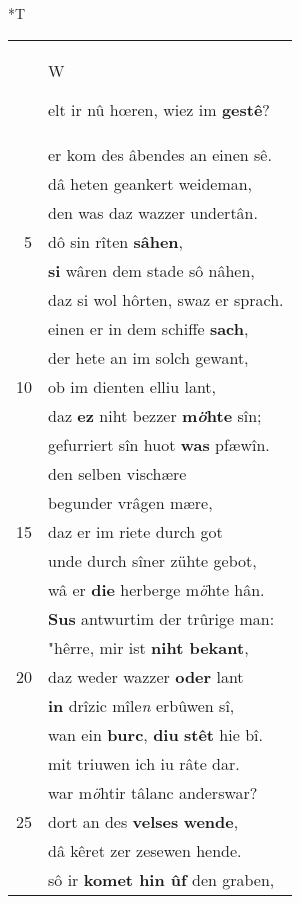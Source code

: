 \documentclass[8pt,a4paper,notitlepage]{article}
\begin{document}
\begin{table}[ht]
\begin{minipage}[t]{0.5\linewidth}
\end{minipage}
\hspace{0.5cm}
\begin{minipage}[t]{0.5\linewidth}
\small
\begin{center}*T
\end{center}
\begin{tabular}{rl}
 & \begin{large}W\end{large}elt ir nû hœren, wiez im \textbf{gestê}?\\ 
 & er kom des âbendes an einen sê.\\ 
 & dâ heten geankert weideman,\\ 
 & den was daz wazzer undertân.\\ 
5 & dô sin rîten \textbf{sâhen},\\ 
 & \textbf{si} wâren dem stade sô nâhen,\\ 
 & daz si wol hôrten, swaz er sprach.\\ 
 & einen er in dem schiffe \textbf{sach},\\ 
 & der hete an im solch gewant,\\ 
10 & ob im dienten elliu lant,\\ 
 & daz \textbf{ez} niht bezzer \textbf{m\textit{ö}hte} sîn;\\ 
 & gefurriert sîn huot \textbf{was} pfæwîn.\\ 
 & den selben vischære\\ 
 & begunder vrâgen mære,\\ 
15 & daz er im riete durch got\\ 
 & unde durch sîner zühte gebot,\\ 
 & wâ er \textbf{die} herberge m\textit{ö}hte hân.\\ 
 & \textbf{Sus} antwurtim der trûrige man:\\ 
 & "hêrre, mir ist \textbf{niht bekant},\\ 
20 & daz weder wazzer \textbf{oder} lant\\ 
 & \textbf{in} drîzic mîle\textit{n} erbûwen sî,\\ 
 & wan ein \textbf{burc}, \textbf{diu} \textbf{stêt} hie bî.\\ 
 & mit triuwen ich iu râte dar.\\ 
 & war m\textit{ö}htir tâlanc anderswar?\\ 
25 & dort an des \textbf{velses} \textbf{wende},\\ 
 & dâ kêret zer zesewen hende.\\ 
 & sô ir \textbf{komet hin ûf} den graben,\\ 

\end{tabular}
\end{minipage}
\end{table}
\end{document}
